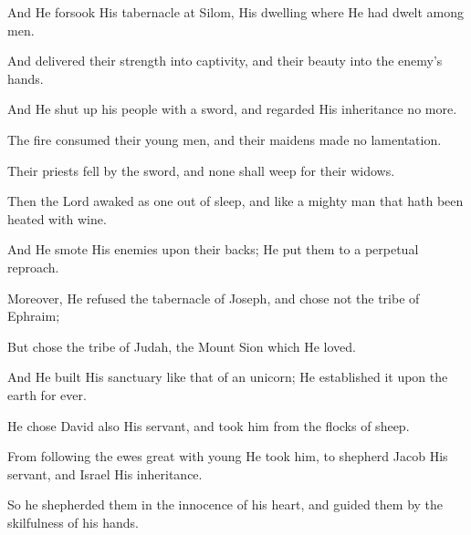 And He forsook His tabernacle at Silom, His dwelling where He had dwelt among men.

And delivered their strength into captivity, and their beauty into the enemy’s hands.

And He shut up his people with a sword, and regarded His inheritance no more.

The fire consumed their young men, and their maidens made no lamentation.

Their priests fell by the sword, and none shall weep for their widows.

Then the Lord awaked as one out of sleep, and like a mighty man that hath been heated with wine.

And He smote His enemies upon their backs; He put them to a perpetual reproach.

Moreover, He refused the tabernacle of Joseph, and chose not the tribe of Ephraim;

But chose the tribe of Judah, the Mount Sion which He loved.

And He built His sanctuary like that of an unicorn; He established it upon the earth for ever.

He chose David also His servant, and took him from the flocks of sheep.

From following the ewes great with young He took him, to shepherd Jacob His servant, and Israel His inheritance.

So he shepherded them in the innocence of his heart, and guided them by the skilfulness of his hands.
